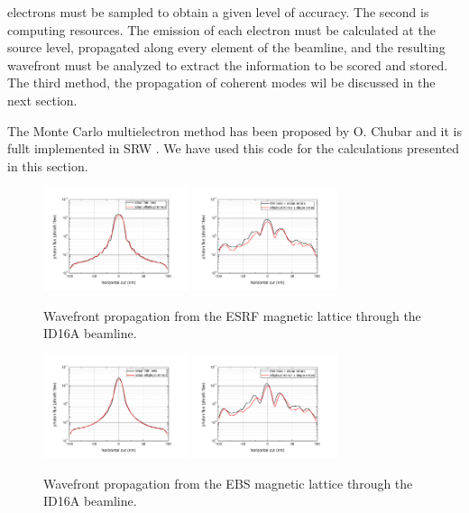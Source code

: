 \documentclass{iucr}              %
\begin{document}
electrons must be sampled to obtain a given level of accuracy. The second is computing resources. The emission of each electron must be calculated at the source level, propagated along every element of the beamline, and the resulting wavefront must be analyzed to extract the information to be scored and stored. The third method, the propagation of coherent modes wil be discussed in the next section. 

The Monte Carlo multielectron method has been proposed by O. Chubar and it is fullt implemented in SRW \cite{codeSRW}. We have used this code for the calculations presented in this section.  

\begin{figure}
    \centering
        \includegraphics[width=4.25cm]{GRAPHICS/esrf_idealTE_idealOE_h.pdf}
        \includegraphics[width=4.25cm]{GRAPHICS/esrf_slopeTE_slopeOE_h.pdf}
    \label{fig:FiniteEmittanceA}
    \caption{Wavefront propagation from the ESRF magnetic lattice through the ID16A beamline.}
\end{figure}

\begin{figure}
    \centering
        \includegraphics[width=4.25cm]{GRAPHICS/ebs_idealTE_idealOE_h.pdf}
        \includegraphics[width=4.25cm]{GRAPHICS/ebs_slopeTE_slopeOE_h.pdf}
    \label{fig:FiniteEmittanceB}
    \caption{Wavefront propagation from the EBS magnetic lattice through the ID16A beamline.}
\end{figure}
\end{document}

